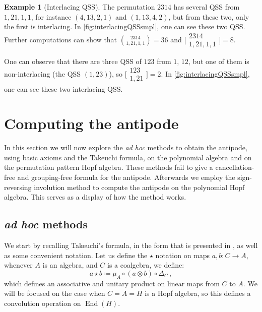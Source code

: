 \documentclass[12pt, reqno]{amsart}
\theoremstyle{definition}
\newtheorem{smpl}[thm]{Example}
\DeclareMathOperator{\End}{\mathrm{End}}
\begin{document}
\begin{smpl}[Interlacing QSS]
The permutation $2314$ has several QSS from $1, 21, 1, 1$, for instance $(4, 13, 2, 1)$ and $(1, 13, 4, 2)$, but from these two, only the first is interlacing.
In \cref{fig:interlacingQSSsmpl}, one can see these two QSS.
Further computations can show that $\binom{2314}{1, 21, 1, 1} = 36$ and $\bigl[\!\begin{smallmatrix} 2314 \\ 1, 21, 1, 1 \end{smallmatrix}\!\bigr] = 8$.

One can observe that there are three QSS of $123$ from $1$, $12$, but one of them is non-interlacing (the QSS $(1,23)$), so
$\bigl[\!\begin{smallmatrix} 123 \\ 1, 21 \end{smallmatrix}\!\bigr] = 2$.
In \cref{fig:interlacingQSSsmpl}, one can see these two interlacing QSS.
\end{smpl}


\section{Computing the antipode\label{sec:antipode_computing}}

In this section we will now explore the \textit{ad hoc} methods to obtain the antipode, using basic axioms and the Takeuchi formula, on the polynomial algebra and on the permutation pattern Hopf algebra.
These methods fail to give a cancellation-free and grouping-free formula for the antipode.
Afterwards we employ the sign-reversing involution method to compute the antipode on the polynomial Hopf algebra.
This serves as a display of how the method works.

\subsection{\textit{ad hoc} methods}
We start by recalling Takeuchi's formula, in the form that is presented in \cite{GrinbergReiner}, as well as some convenient notation.
Let us define the $\star$ notation on maps $a, b: C \to A$, whenever $A$ is an algebra, and $C$ is a coalgebra, we define:
$$a \star b \coloneqq \mu_A \circ (a \otimes b) \circ \Delta_C\, ,$$
which defines an associative and unitary product on linear maps from $C$ to $A$. We will be focused on the case when $C=A=H$ is a Hopf algebra, so this defines a convolution operation on $\End(H)$.
\end{document}
